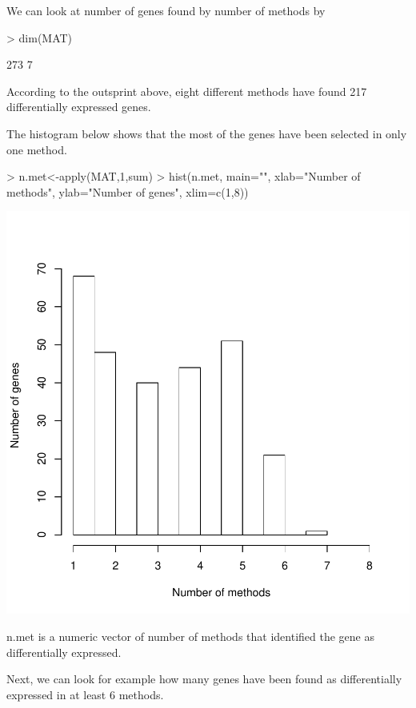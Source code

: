 \documentclass[a4paper]{report}
\begin{document}
We can look at number of genes found by number of methods by
\begin{Schunk}
\begin{Sinput}
> dim(MAT)
\end{Sinput}
\begin{Soutput}
[1] 273   7
\end{Soutput}
\end{Schunk}
According to the outsprint above, eight different methods have found 217 differentially expressed genes. \par
The histogram below shows that the most of the genes have been selected in only one method. 
\begin{center}
\begin{Schunk}
\begin{Sinput}
> n.met<-apply(MAT,1,sum)
> hist(n.met, main="", xlab="Number of methods", ylab="Number of genes", xlim=c(1,8))
\end{Sinput}
\end{Schunk}
\includegraphics{MAMA_full-071}
\end{center}
{\ttfamily n.met} is a numeric vector of number of methods that identified the gene as differentially expressed. \par 
Next, we can look for example how many genes have been found as differentially expressed in at least 6 methods.
\end{document}
